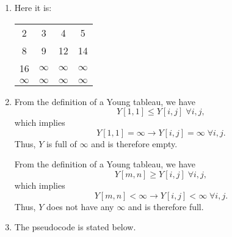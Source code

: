 \documentclass{report}
\makeatletter
\renewenvironment{framed}{%
 \def\FrameCommand##1{\hskip\@totalleftmargin
 \fboxsep=\FrameSep\fbox{##1}}%
 \MakeFramed {\advance\hsize-\width
   \@totalleftmargin\z@ \linewidth\hsize
   \@setminipage}}%
 {\par\unskip\endMakeFramed}
\DeclareMathOperator{\Forall}{\forall}
\makeatother
\begin{document}
\begin{enumerate}
\begin{framed}
\begin{enumerate}
\item Here it is:

\begin{center}
\begin{tabular}{cccc}
  2 & 3 & 4 & 5\\
  8 & 9 & 12 & 14\\
  16 & $\infty$ & $\infty$ & $\infty$\\
  $\infty$ & $\infty$ & $\infty$ & $\infty$
\end{tabular}
\end{center}

\item From the definition of a Young tableau, we have
\[
  Y[1, 1] \le Y[i, j]\;\Forall i, j,
\]
which implies
\[
  Y[1, 1] = \infty \rightarrow Y[i, j] = \infty\;\Forall i, j.
\]
Thus, $Y$ is full of $\infty$ and is therefore empty.

From the definition of a Young tableau, we have
\[
  Y[m, n] \ge Y[i, j]\;\Forall i, j,
\]
which implies
\[
  Y[m, n] < \infty \rightarrow Y[i, j] < \infty\;\Forall i, j.
\]
Thus, $Y$ does not have any $\infty$ and is therefore full.

\item The pseudocode is stated below.

\begin{algorithm}[H]
\SetAlgoNoEnd\DontPrintSemicolon
\BlankLine
{}
\end{algorithm}

\begin{algorithm}[H]
\SetAlgoNoEnd\DontPrintSemicolon
\BlankLine
{}
\end{algorithm}


\end{enumerate}
\end{framed}
\end{enumerate}
\end{document}
